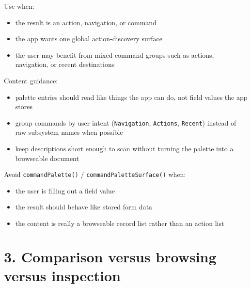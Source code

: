 Use when:

\begin{itemize}
\tightlist
\item
  the result is an action, navigation, or command
\item
  the app wants one global action-discovery surface
\item
  the user may benefit from mixed command groups such as actions, navigation, or recent destinations
\end{itemize}

Content guidance:

\begin{itemize}
\tightlist
\item
  palette entries should read like things the app can do, not field values the app stores
\item
  group commands by user intent (\texttt{N\allowbreak{}a\allowbreak{}v\allowbreak{}i\allowbreak{}g\allowbreak{}a\allowbreak{}t\allowbreak{}i\allowbreak{}o\allowbreak{}n}, \texttt{A\allowbreak{}c\allowbreak{}t\allowbreak{}i\allowbreak{}o\allowbreak{}n\allowbreak{}s}, \texttt{R\allowbreak{}e\allowbreak{}c\allowbreak{}e\allowbreak{}n\allowbreak{}t}) instead of raw subsystem names when possible
\item
  keep descriptions short enough to scan without turning the palette into a browseable document
\end{itemize}

Avoid \texttt{c\allowbreak{}o\allowbreak{}m\allowbreak{}m\allowbreak{}a\allowbreak{}n\allowbreak{}d\allowbreak{}P\allowbreak{}a\allowbreak{}l\allowbreak{}e\allowbreak{}t\allowbreak{}t\allowbreak{}e\allowbreak{}(\allowbreak{})} / \texttt{c\allowbreak{}o\allowbreak{}m\allowbreak{}m\allowbreak{}a\allowbreak{}n\allowbreak{}d\allowbreak{}P\allowbreak{}a\allowbreak{}l\allowbreak{}e\allowbreak{}t\allowbreak{}t\allowbreak{}e\allowbreak{}S\allowbreak{}u\allowbreak{}r\allowbreak{}f\allowbreak{}a\allowbreak{}c\allowbreak{}e\allowbreak{}(\allowbreak{})} when:

\begin{itemize}
\tightlist
\item
  the user is filling out a field value
\item
  the result should behave like stored form data
\item
  the content is really a browseable record list rather than an action list
\end{itemize}

\section{3. Comparison versus browsing versus inspection}\label{record-023-comparison-versus-browsing-versus-inspection}

